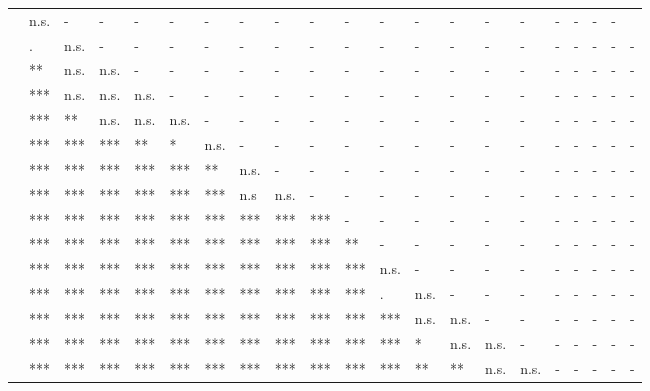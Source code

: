 \documentclass[11pt,fleqn]{article}
\newcommand{\6}{\mbox{$[\hspace*{-.6mm}[$}}
\newcommand{\9}{\mbox{$]\hspace*{-.6mm}]$}}
\begin{document}
\begin{table}[h!]
\begin{tabular}{l l l l l l l l l l l l l l l l l l l l l }
\color{gray}{\em pretend}\color{black}	&  n.s. & - & - & - & - & - & - & - & - & - & - & - & - & - & - & - & - & - & - \\
\color{blue}{\em be right}\color{black}	& . & n.s. & - & - & - & - & - & - & - & - & - & - & - & - & - & - & - & - & - & - \\
\color{gray}{\em think}\color{black}		& ** & n.s. & n.s. & - & - & - & - & - & - & - & - & - & - & - & - & - & - & - & - & - \\
\color{gray}{\em suggest}\color{black}	& ***	& n.s. & n.s. & n.s. & - & - & - & - & - & - & - & - & - & - & - & - & - & - & - & - \\
\color{gray}{\em say}	\color{black}	& ***	& ** & n.s. & n.s. & n.s. & - & - & - & - & - & - & - & - & - & - & - & - & - & - & - \\
\color{orange}{\em prove}\color{black}		& ***	& *** &  ***  & ** & * & n.s. & - & - & - & - & - & - & - & - & - & - & - & - & - & - \\
\color{orange}{\em confirm}\color{black}	&***	& ***  &  ***  &  ***  &  ***  & ** & n.s. & - & - & - & - & - & - & - & - & - & - & - & - & - \\
\color{orange}{\em establish}\color{black}	&***	&  ***  &  ***  &  ***  &  ***  &  ***  & n.s & n.s. & - & - & - & - & - & - & - & - & - & - & - & - \\
\color{blue}{\em demonstrate}\color{black} &*** & *** & *** & *** &  *** &  *** &  ***  &  ***  &  ***  & - & - & - & - & - & - & - & - & - & - & - \\
\color{orange}{\em announce}\color{black}		& ***	& *** & *** & *** & *** & *** & *** &  ***  &  ***  & ** & - & - & - & - & - & - & - & - & - & - \\
\color{orange}{\em confess}\color{black}	& ***	& *** & *** & *** & *** & *** & *** & *** & *** &  ***  & n.s. & - & - & - & - & - & - & - & - & - \\
\color{orange}{\em admit}\color{black}		& ***	& *** & *** & *** & *** & *** & *** & *** & *** &  ***  & . & n.s. &  - & - & - & - & - & - & - & - \\
\color{violet}{\em reveal}\color{black}			& ***	& *** & *** & *** & *** & *** & *** & *** & *** &  ***  &  ***  & n.s. & n.s. & - & - & - & - & - & - & - \\
\color{orange}{\em acknowledge}\color{black}	& ***	& *** & *** & *** & *** & *** & *** & *** & *** &  ***  &  ***  & * & n.s. & n.s. & - & - & - & - & - & - \\
\color{orange}{\em hear}\color{black}		& ***	& *** & *** & *** & *** & *** & *** & *** & *** & *** &  ***  &  **  & ** & n.s. & n.s. & - & - & - & - & - \\

\end{tabular}
\end{table}
\end{document}
